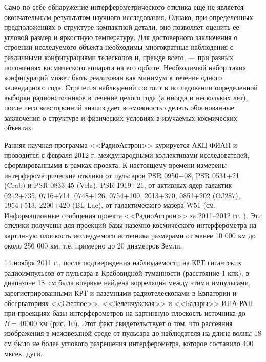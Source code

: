 Само по себе обнаружение интерферометрического отклика ещё не является окончательным результатом
научного исследования. Однако, при определенных предположениях о структуре компактной детали, оно
позволяет оценить ее угловой размер и яркостную температуру. Для достоверного заключения о строении
исследуемого объекта необходимы многократные наблюдения с различными конфигурациями телескопов и,
прежде всего, --- при разных положениях космического аппарата на его орбите. Необходимый набор таких
конфигураций может быть реализован как минимум в течение одного календарного года. Стратегия
наблюдений состоит в исследовании определенной выборки радиоисточников в течение целого года (а
иногда и нескольких лет), после чего всесторонний анализ дает возможность сделать обоснованные
заключения о структуре и физических условиях в изучаемых космических объектах.

Ранняя научная программа <<РадиоАстрон>> курируется АКЦ ФИАН и проводится с февраля 2012 г.
международными коллективами исследователей, сформированными в рамках проекта. К настоящему времени
измерены интерферометрические отклики от пульсаров PSR 0950+08, PSR 0531+21 (Crab) и PSR 0833-45
(Vela), PSR 1919+21, от активных ядер галактик 0212+735, 0716+714, 0748+126, 0754+100, 2013+370,
0851+202 (OJ287), 1954+513, 2200+420 (BL Lac), от галактического мазера W51 (см. Информационные
сообщения проекта <<РадиоАстрон>> за 2011--2012 гг. \cite{RA_news}). Эти отклики получены для
проекций базы наземно-космического интерферометра на картинную плоскость исследуемого источника
размерами от менее 10 000 км до около 250 000 км, т.е. примерно до 20 диаметров Земли.

14 ноября 2011 г., после подтверждения наблюдаемости на КРТ гигантских радиоимпульсов от пульсара в
Крабовидной туманности (расстояние 1 кпк), в диапазоне 18~см была впервые найдена корреляция между
этими импульсами, зарегистрированными КРТ и наземными радиотелескопами в Евпатории и обсерваториях
<<Светлое>>, <<Зеленчукская>> и <<Бадары>> ИПА РАН при проекциях базы интерферометров на картинную
плоскость источника до $B = 40 000$ км (рис. 10). Этот факт свидетельствует о том, что рассеяния
изображения в межзвездной среде от пульсара до наблюдателя на длине волны 18 см было не более
углового разрешения интерферометра, которое составило 400 мксек. дуги.

